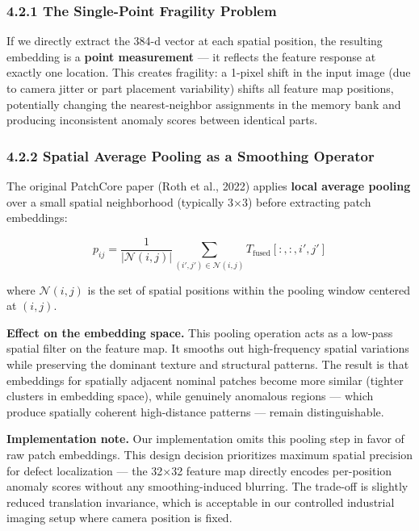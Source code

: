 \subsubsection{4.2.1 The Single-Point Fragility Problem}\label{the-single-point-fragility-problem}

If we directly extract the 384-d vector at each spatial position, the resulting embedding is a \textbf{point measurement} --- it reflects the feature response at exactly one location. This creates fragility: a 1-pixel shift in the input image (due to camera jitter or part placement variability) shifts all feature map positions, potentially changing the nearest-neighbor assignments in the memory bank and producing inconsistent anomaly scores between identical parts.

\subsubsection{4.2.2 Spatial Average Pooling as a Smoothing Operator}\label{spatial-average-pooling-as-a-smoothing-operator}

The original PatchCore paper (Roth et al., 2022) applies \textbf{local average pooling} over a small spatial neighborhood (typically 3×3) before extracting patch embeddings:

\[p_{ij} = \frac{1}{|\mathcal{N}(i,j)|} \sum_{(i', j') \in \mathcal{N}(i,j)} T_{\text{fused}}[:, :, i', j']\]

where \(\mathcal{N}(i,j)\) is the set of spatial positions within the pooling window centered at \((i,j)\).

\textbf{Effect on the embedding space.} This pooling operation acts as a low-pass spatial filter on the feature map. It smooths out high-frequency spatial variations while preserving the dominant texture and structural patterns. The result is that embeddings for spatially adjacent nominal patches become more similar (tighter clusters in embedding space), while genuinely anomalous regions --- which produce spatially coherent high-distance patterns --- remain distinguishable.

\textbf{Implementation note.} Our implementation omits this pooling step in favor of raw patch embeddings. This design decision prioritizes maximum spatial precision for defect localization --- the 32×32 feature map directly encodes per-position anomaly scores without any smoothing-induced blurring. The trade-off is slightly reduced translation invariance, which is acceptable in our controlled industrial imaging setup where camera position is fixed.

